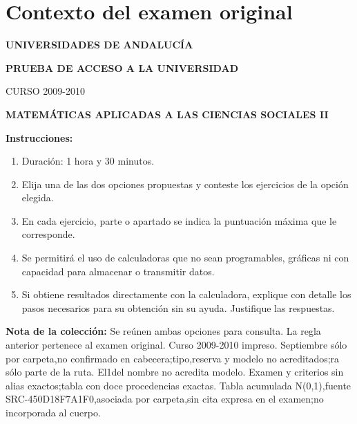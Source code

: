 \section*{Contexto del examen original}
\textbf{UNIVERSIDADES DE ANDALUCÍA}\par
\textbf{PRUEBA DE ACCESO A LA UNIVERSIDAD}\par
CURSO 2009-2010\par
\textbf{MATEMÁTICAS APLICADAS A LAS CIENCIAS SOCIALES II}

\textbf{Instrucciones:}
\begin{enumerate}[label=\textbf{\alph*)}]
  \item Duración: 1 hora y 30 minutos.
  \item Elija una de las dos opciones propuestas y conteste los ejercicios de la opción elegida.
  \item En cada ejercicio, parte o apartado se indica la puntuación máxima que le corresponde.
  \item Se permitirá el uso de calculadoras que no sean programables, gráficas ni con capacidad para almacenar o transmitir datos.
  \item Si obtiene resultados directamente con la calculadora, explique con detalle los pasos necesarios para su obtención sin su ayuda. Justifique las respuestas.
\end{enumerate}
\noindent\textbf{Nota de la colección:} Se reúnen ambas opciones para consulta. La regla anterior pertenece al examen original. Curso 2009-2010 impreso. Septiembre sólo por carpeta,no confirmado en cabecera;tipo,reserva y modelo no acreditados;ra sólo parte de la ruta. El1del nombre no acredita modelo. Examen y criterios sin alias exactos;tabla con doce procedencias exactas. Tabla acumulada N(0,1),fuente SRC-450D18F7A1F0,asociada por carpeta,sin cita expresa en el examen;no incorporada al cuerpo.
\par\medskip
